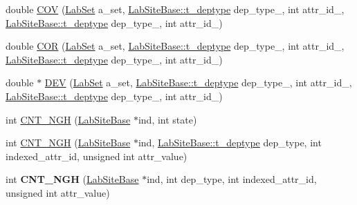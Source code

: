 \begin{DoxyCompactItemize}
\item 
double \hyperlink{classelps_1_1_lab_site_sets_calculator_aa7f504d7b33ef9030906912fe474d417}{C\+O\+V} (\hyperlink{classelps_1_1_lab_set}{Lab\+Set} a\+\_\+set, \hyperlink{classelps_1_1_lab_site_base_a8ec08fafa015dfa53827d985608afe58}{Lab\+Site\+Base\+::t\+\_\+deptype} dep\+\_\+type\+\_, int attr\+\_\+id\+\_, \hyperlink{classelps_1_1_lab_site_base_a8ec08fafa015dfa53827d985608afe58}{Lab\+Site\+Base\+::t\+\_\+deptype} dep\+\_\+type\+\_, int attr\+\_\+id\+\_)
\item 
double \hyperlink{classelps_1_1_lab_site_sets_calculator_a508e9efda43d609c011157704931b170}{C\+O\+R} (\hyperlink{classelps_1_1_lab_set}{Lab\+Set} a\+\_\+set, \hyperlink{classelps_1_1_lab_site_base_a8ec08fafa015dfa53827d985608afe58}{Lab\+Site\+Base\+::t\+\_\+deptype} dep\+\_\+type\+\_, int attr\+\_\+id\+\_, \hyperlink{classelps_1_1_lab_site_base_a8ec08fafa015dfa53827d985608afe58}{Lab\+Site\+Base\+::t\+\_\+deptype} dep\+\_\+type\+\_, int attr\+\_\+id\+\_)
\item 
double $\ast$ \hyperlink{classelps_1_1_lab_site_sets_calculator_ac115ae63b6638f2854c4edb73af883d2}{D\+E\+V} (\hyperlink{classelps_1_1_lab_set}{Lab\+Set} a\+\_\+set, \hyperlink{classelps_1_1_lab_site_base_a8ec08fafa015dfa53827d985608afe58}{Lab\+Site\+Base\+::t\+\_\+deptype} dep\+\_\+type\+\_, int attr\+\_\+id\+\_, \hyperlink{classelps_1_1_lab_site_base_a8ec08fafa015dfa53827d985608afe58}{Lab\+Site\+Base\+::t\+\_\+deptype} dep\+\_\+type\+\_, int attr\+\_\+id\+\_)
\item 
int \hyperlink{classelps_1_1_lab_site_sets_calculator_ae496331378c99233bd66868ca45d4e2e}{C\+N\+T\+\_\+\+N\+G\+H} (\hyperlink{classelps_1_1_lab_site_base}{Lab\+Site\+Base} $\ast$ind, int state)
\item 
int \hyperlink{classelps_1_1_lab_site_sets_calculator_a447349580b0d2db475d356923c7b4c44}{C\+N\+T\+\_\+\+N\+G\+H} (\hyperlink{classelps_1_1_lab_site_base}{Lab\+Site\+Base} $\ast$ind, \hyperlink{classelps_1_1_lab_site_base_a8ec08fafa015dfa53827d985608afe58}{Lab\+Site\+Base\+::t\+\_\+deptype} dep\+\_\+type, int indexed\+\_\+attr\+\_\+id, unsigned int attr\+\_\+value)
\item 
\hypertarget{classelps_1_1_lab_site_sets_calculator_a513fad80ca68f6710d6d56a1d0ffc521}{int {\bfseries C\+N\+T\+\_\+\+N\+G\+H} (\hyperlink{classelps_1_1_lab_site_base}{Lab\+Site\+Base} $\ast$ind, int dep\+\_\+type, int indexed\+\_\+attr\+\_\+id, unsigned int attr\+\_\+value)}\label{classelps_1_1_lab_site_sets_calculator_a513fad80ca68f6710d6d56a1d0ffc521}


\end{DoxyCompactItemize}
